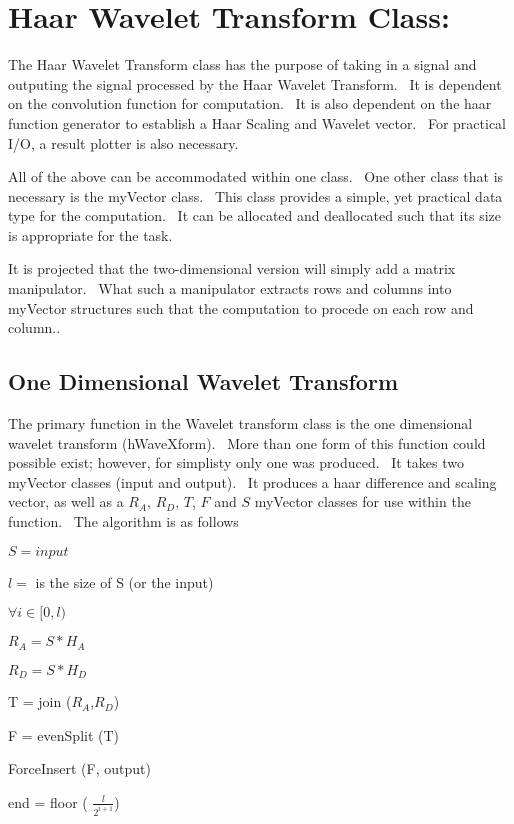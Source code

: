 \documentclass{article}
\begin{document}
\section{Haar Wavelet Transform Class:}

\bigskip The Haar Wavelet Transform class has the purpose of taking in a
signal and outputing the signal processed by the Haar Wavelet Transform. \
It is dependent on the convolution function for computation. \ It is also
dependent on the haar function generator to establish a Haar Scaling and
Wavelet vector. \ For practical I/O, a result plotter is also necessary. \ 

\bigskip All of the above can be accommodated within one class. \ One other
class that is necessary is the myVector class. \ This class provides a
simple, yet practical data type for the computation. \ It can be allocated
and deallocated such that its size is appropriate for the task. \ 

It is projected that the two-dimensional version will simply add a matrix
manipulator. \ What such a manipulator extracts rows and columns into
myVector structures such that the computation to procede on each row and
column.. \ 

\subsection{\protect\bigskip One Dimensional Wavelet Transform}

The primary function in the Wavelet transform class is the one dimensional
wavelet transform (hWaveXform). \ More than one form of this function could
possible exist; however, for simplisty only one was produced. \ It takes two
myVector classes (input and output). \ It produces a haar difference and
scaling vector, as well as a $R_{A}$, $R_{D}$, $T$, $F$ and $S$ myVector
classes for use within the function. \ The algorithm is as follows

$S=input$

$l=$ is the size of S (or the input)

$\forall i\in \lbrack 0,l)$

\qquad $R_{A}=S\ast H_{A}$

\qquad $R_{D}=S\ast H_{D}$

\qquad T = join ($R_{A}$,$R_{D}$)

\qquad F = evenSplit (T)

\qquad ForceInsert (F, output)

\qquad end = floor ( $\frac{l}{2^{i+1}}$)
\end{document}
